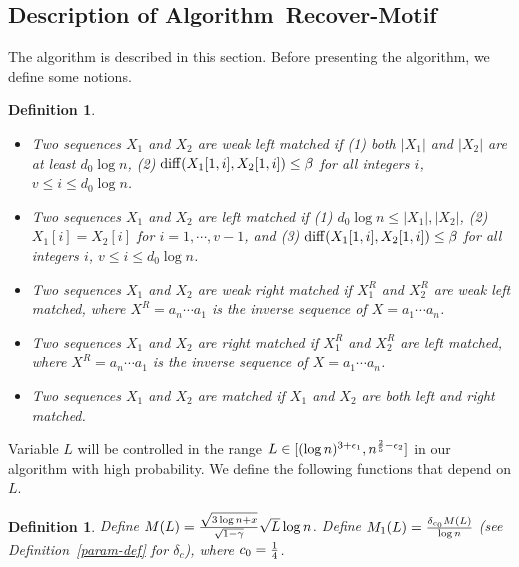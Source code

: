 \documentclass[11pt]{article}
\newtheorem{dfntn}[theoremfoo]{Definition}
\newenvironment{definition}{\pagebreak[1]\begin{dfntn}\rm}{\end{dfntn}}
\newcommand{\scrod}{\quad\nopagebreak}
\newcommand{\diff}{{\rm diff}}
\newcommand{\algmnam}{Recover-Motif}
\newcommand{\algmname}{Algorithm~\algmnam}
\newcommand{\algma}{\algmname~}
\begin{document}
\subsection{Description of  \algma}\label{algorithm-sec}

The algorithm is described in this section. Before presenting the
algorithm, we define some notions.



\begin{definition}\label{match-def}{\scrod}
\begin{itemize}
\item
Two sequences $X_1$ and $X_2$ are {\it weak left matched} if (1)
both $|X_1|$ and $|X_2|$ are at least $d_0\log n$, (2)
$\diff(X_1[1,i], X_2[1,i])\le \beta$ for all integers $i$, $v\le
i\le d_0\log n$.

\item
Two sequences $X_1$ and $X_2$ are {\it left matched} if (1) $d_0\log
n\le |X_1|,|X_2|$, (2) $X_1[i]=X_2[i]$ for $i=1,\cdots, v-1$, and
(3) $\diff(X_1[1,i], X_2[1,i])\le \beta$ for all integers $i$, $v\le
i\le d_0\log n$.

\item
Two sequences $X_1$ and $X_2$ are {\it weak right matched} if
$X_1^R$ and $X_2^R$ are weak left matched, where $X^R=a_n\cdots a_1$
is the inverse sequence of $X=a_1\cdots a_n$.

\item
Two sequences $X_1$ and $X_2$ are {\it right matched} if $X_1^R$ and
$X_2^R$ are left matched, where $X^R=a_n\cdots a_1$ is the inverse
sequence of $X=a_1\cdots a_n$.

\item
Two sequences $X_1$ and $X_2$ are {\it matched} if $X_1$ and $X_2$
are both left and right matched.
\end{itemize}
\end{definition}


Variable $L$ will be controlled in the range $L\in [(\log
n)^{3+\epsilon_1}, n^{{2\over 5}-\epsilon_2}]$ in our algorithm with
high probability. We define the following functions that depend on
$L$.

\begin{definition}\label{M-M1-def}
Define $M(L)={\sqrt{3\log n+x}\over \sqrt{1-\gamma}}\sqrt{L}\log n$.
 Define $M_1(L)={\delta_{c_0} M(L)\over \log n}$ (see
Definition~\ref{param-def} for $\delta_c$), where $c_0={1\over 4}$.
\end{definition}
\end{document}

